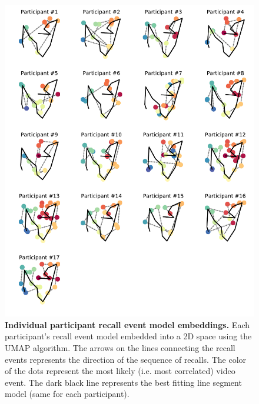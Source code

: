 \begin{figure}[t!]
\centering
\includegraphics[width=1\textwidth]{figs/supp2_projs.pdf}
\caption{\small \textbf{Individual participant recall event model embeddings.} Each participant's recall event model embedded into a 2D space using the UMAP algorithm. The arrows on the lines connecting the recall events represents the direction of the sequence of recalls.  The color of the dots represent the most likely (i.e. most correlated) video event. The dark black line represents the best fitting line segment model (same for each participant).}
\label{fig:ind_embeddings}
\end{figure}
